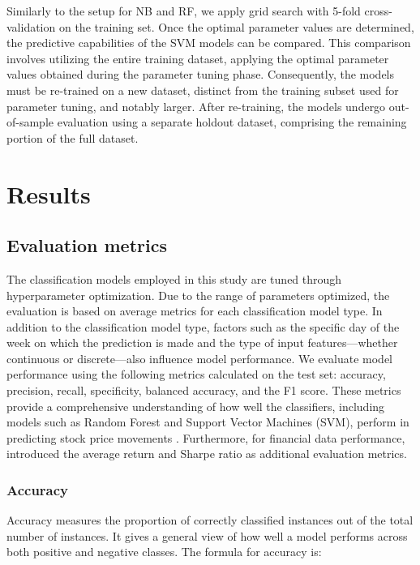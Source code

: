 \documentclass[aodsor,preprint]{imsart}
\numberwithin{equation}{section}
\theoremstyle{plain}
\begin{document}
Similarly to the setup for NB and RF, we apply grid search with 5-fold cross-validation on the training set. Once the optimal parameter values are determined, the predictive capabilities of the SVM models can be compared. This comparison involves utilizing the entire training dataset, applying the optimal parameter values obtained during the parameter tuning phase. Consequently, the models must be re-trained on a new dataset, distinct from the training subset used for parameter tuning, and notably larger. After re-training, the models undergo out-of-sample evaluation using a separate holdout dataset, comprising the remaining portion of the full dataset.




\section{Results}
\subsection{Evaluation metrics}

The classification models employed in this study are tuned through hyperparameter optimization. Due to the range of parameters optimized, the evaluation is based on average metrics for each classification model type. In addition to the classification model type, factors such as the specific day of the week on which the prediction is made and the type of input features—whether continuous or discrete—also influence model performance. We evaluate model performance using the following metrics calculated on the test set: accuracy, precision, recall, specificity, balanced accuracy, and the F1 score. These metrics provide a comprehensive understanding of how well the classifiers, including models such as Random Forest and Support Vector Machines (SVM), perform in predicting stock price movements \cite{pagliaro2023, patel2015}. Furthermore, for financial data performance, \cite{shynkevich2017} introduced the average return and Sharpe ratio as additional evaluation metrics.

\subsubsection{Accuracy}

Accuracy measures the proportion of correctly classified instances out of the total number of instances. It gives a general view of how well a model performs across both positive and negative classes. The formula for accuracy is:
\end{document}
